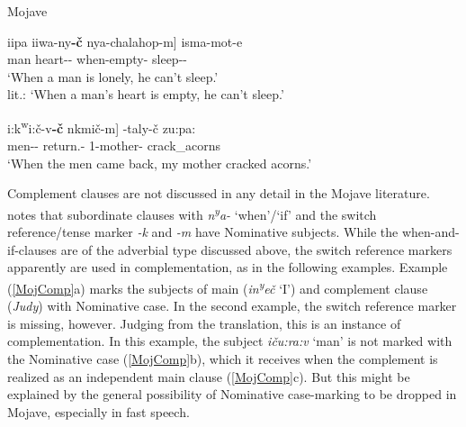 \begin{exe}\ex\label{MojTemp} {Mojave} \citetext{\citealt[12]{Munro.com:1980}, \citealt[322]{Langdon.Munro:1979}}\nopagebreak[4]
\begin{xlist}
\ex\gll  {\rm[}\textglotstop iipa iiwa-ny\textbf{-\v c} nya-chalahop-m{\rm]} isma-mot-e\\
man heart-\dem{}-\nom{} when-empty-\dsbj{} sleep-\Neg{}-\fut{}\\
`When a man is lonely, he can't sleep.'\\
lit.: `When a man's heart is empty, he can't sleep.' %

\ex\gll  {\rm[}\textglotstop i:k\textsuperscript{w}i:\v c-v\textschwa\textbf{-\v c} n\textschwa k\textschwa mi\v c-m{\rm]} \textglotstop\textschwa-taly-\v c zu:pa:\\
men-\dem{}-\nom{} return.\pl{}-\dsbj{} 1-mother-\nom{} crack\_acorns\\
`When the men came back, my mother cracked acorns.' %
\end{xlist}
\end{exe}

Complement clauses are not discussed in any detail in the Mojave literature.  
\citet[232--234]{Munro:1976} notes that subordinate clauses with \emph{n\textsuperscript{y}a-} `when'/`if' and the switch reference/tense marker \emph{-k} and \emph{-m} have Nominative  subjects. 
While the when-and-if-clauses are of the adverbial type discussed above, the switch reference markers apparently are used in complementation, as in the following examples. 
Example (\ref{MojComp}a) marks the subjects of main (\emph{in\textsuperscript{y}e\v c} `I') and complement clause (\emph{Judy}) with Nominative  case.
In the second example, the switch reference marker is missing, however. 
Judging from the translation, this is an instance of complementation. 
In this example, the subject \emph{i\v cu:ra:v} `man' is not marked with the Nominative  case (\ref{MojComp}b), which it receives when the complement is realized as an independent main clause (\ref{MojComp}c). 
But this might be explained by the general possibility of Nominative case-marking to be dropped in Mojave, especially in fast speech.

